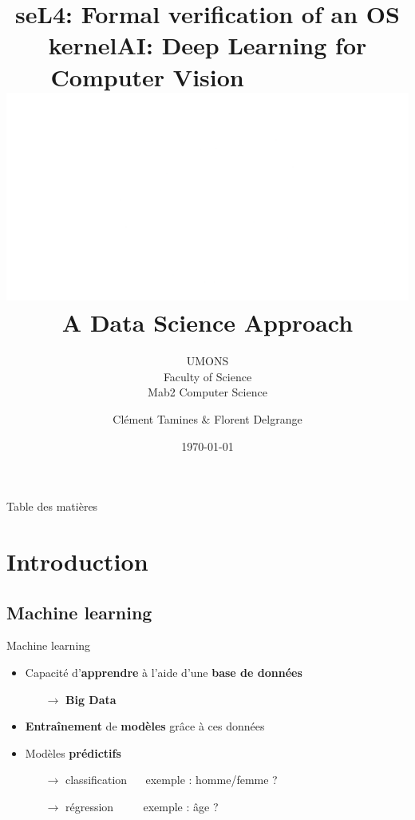 \documentclass[compress]{beamer}
\title{seL4: Formal verification of an OS kernel} %
\author{Clément Tamines \& Florent Delgrange}
\subtitle{\normalsize UMONS \\ Faculty of Science \\ Mab2 Computer Science}
\date{\today}
\title{AI: Deep Learning for\\\vspace{-.05\linewidth} Computer Vision $\quad  \quad \quad \quad \quad$\includegraphics[width=0.2\linewidth]{resources/eye}\\
{\normalsize A Data Science Approach}} %
\begin{document}
  \begin{frame}[plain]
    \maketitle
  \end{frame}

  \AtBeginSection[]
    {
      \begin{frame}{\contentsname}
      \tableofcontents[currentsection]
      \end{frame}
    }

\begin{frame}{Table des matières}
  \tableofcontents
\end{frame}

\section{Introduction}
\subsection{Machine learning}
\begin{frame}{Machine learning}
  \begin{itemize}
    \item Capacité d'\textbf{\color{fibeamer@orange}apprendre} à l'aide d'une \textbf{\color{fibeamer@orange}base de données}
    \begin{itemize}
      \item[$\rightarrow$] \textbf{\color{fibeamer@orange} Big Data}
    \end{itemize}
    \item \textbf{\color{fibeamer@orange}Entraînement} de \textbf{\color{fibeamer@orange}modèles} grâce à ces données
    \item Modèles \textbf{\color{fibeamer@orange}prédictifs}
    \begin{itemize}
      \item[$\rightarrow$] classification
        $\quad$ exemple : homme/femme ?
      \item[$\rightarrow$] régression $ \quad \quad$
        exemple : âge ?
    \end{itemize}
  \end{itemize}
\end{frame}
\end{document}
